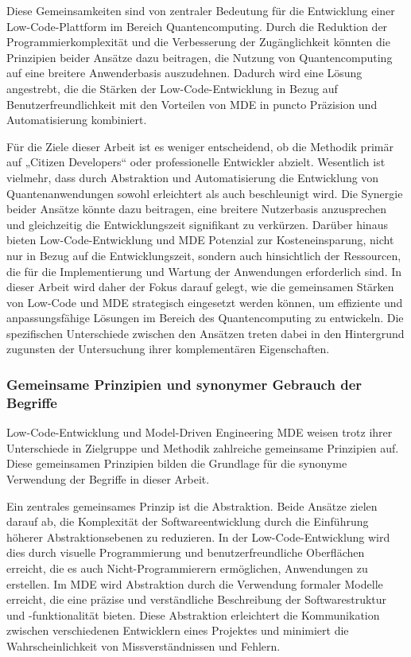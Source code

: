 Diese Gemeinsamkeiten sind von zentraler Bedeutung für die Entwicklung einer Low-Code-Plattform im Bereich Quantencomputing. 
Durch die Reduktion der Programmierkomplexität und die Verbesserung der Zugänglichkeit könnten die Prinzipien beider Ansätze 
dazu beitragen, die Nutzung von Quantencomputing auf eine breitere Anwenderbasis auszudehnen. Dadurch wird eine Lösung angestrebt, 
die die Stärken der Low-Code-Entwicklung in Bezug auf Benutzerfreundlichkeit mit den Vorteilen von MDE in puncto Präzision und 
Automatisierung kombiniert. 

Für die Ziele dieser Arbeit ist es weniger entscheidend, ob die Methodik primär auf „Citizen Developers“ oder professionelle Entwickler abzielt. 
Wesentlich ist vielmehr, dass durch Abstraktion und Automatisierung die Entwicklung von Quantenanwendungen sowohl erleichtert als auch 
beschleunigt wird. Die Synergie beider Ansätze könnte dazu beitragen, eine breitere Nutzerbasis anzusprechen und gleichzeitig die Entwicklungszeit 
signifikant zu verkürzen. Darüber hinaus bieten Low-Code-Entwicklung und MDE Potenzial zur Kosteneinsparung, nicht nur in Bezug auf die 
Entwicklungszeit, sondern auch hinsichtlich der Ressourcen, die für die Implementierung und Wartung der Anwendungen erforderlich sind. 
In dieser Arbeit wird daher der Fokus darauf gelegt, wie die gemeinsamen Stärken von Low-Code und MDE strategisch eingesetzt werden können, 
um effiziente und anpassungsfähige Lösungen im Bereich des Quantencomputing zu entwickeln. Die spezifischen Unterschiede zwischen den 
Ansätzen treten dabei in den Hintergrund zugunsten der Untersuchung ihrer komplementären Eigenschaften.


\subsubsection{Gemeinsame Prinzipien und synonymer Gebrauch der Begriffe}
Low-Code-Entwicklung und Model-Driven Engineering MDE weisen trotz ihrer Unterschiede in Zielgruppe und Methodik zahlreiche 
gemeinsame Prinzipien auf. Diese gemeinsamen Prinzipien bilden die Grundlage für die synonyme Verwendung der Begriffe in dieser Arbeit.

Ein zentrales gemeinsames Prinzip ist die Abstraktion. Beide Ansätze zielen darauf ab, die Komplexität der Softwareentwicklung 
durch die Einführung höherer Abstraktionsebenen zu reduzieren. In der Low-Code-Entwicklung wird dies durch visuelle Programmierung 
und benutzerfreundliche Oberflächen erreicht, die es auch Nicht-Programmierern ermöglichen, Anwendungen zu erstellen. Im MDE 
wird Abstraktion durch die Verwendung formaler Modelle erreicht, die eine präzise und verständliche Beschreibung der 
Softwarestruktur und -funktionalität bieten. Diese Abstraktion erleichtert die Kommunikation zwischen verschiedenen 
Entwicklern eines Projektes und minimiert die Wahrscheinlichkeit von Missverständnissen und Fehlern.

